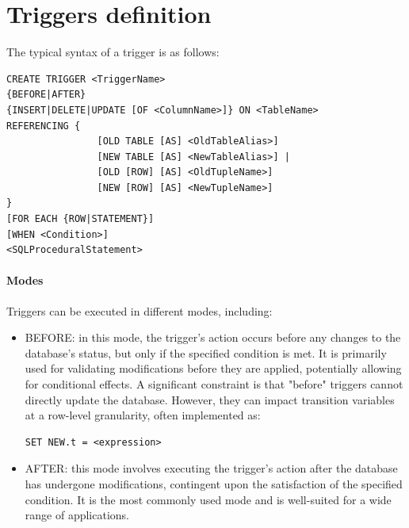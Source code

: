 \section{Triggers definition}

The typical syntax of a trigger is as follows:
\begin{lstlisting}[style=SQL]
CREATE TRIGGER <TriggerName>
{BEFORE|AFTER}
{INSERT|DELETE|UPDATE [OF <ColumnName>]} ON <TableName>
REFERENCING { 
                [OLD TABLE [AS] <OldTableAlias>]
                [NEW TABLE [AS] <NewTableAlias>] |
                [OLD [ROW] [AS] <OldTupleName>]
                [NEW [ROW] [AS] <NewTupleName>]
}
[FOR EACH {ROW|STATEMENT}]
[WHEN <Condition>]
<SQLProceduralStatement> 
\end{lstlisting}

\paragraph*{Modes}
Triggers can be executed in different modes, including:
\begin{itemize}
    \item BEFORE: in this mode, the trigger's action occurs before any changes to the database's status, but only if the specified condition is met.
        It is primarily used for validating modifications before they are applied, potentially allowing for conditional effects.
        A significant constraint is that "before" triggers cannot directly update the database. 
        However, they can impact transition variables at a row-level granularity, often implemented as: 
        \begin{lstlisting}[style=SQL]
SET NEW.t = <expression>
        \end{lstlisting}
    \item AFTER: this mode involves executing the trigger's action after the database has undergone modifications, contingent upon the satisfaction of the specified condition.
        It is the most commonly used mode and is well-suited for a wide range of applications.
\end{itemize}

